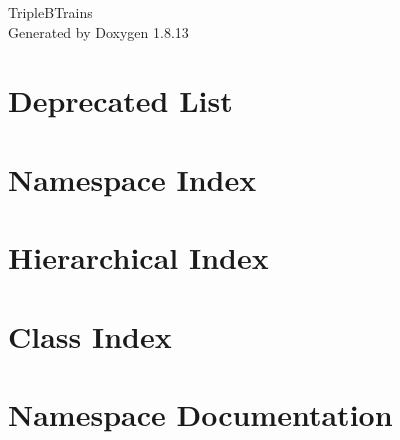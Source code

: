 \documentclass[twoside]{book}
\newcommand{\+}{\discretionary{\mbox{\scriptsize$\hookleftarrow$}}{}{}}
\newcommand{\clearemptydoublepage}{%
  \newpage{\pagestyle{empty}\cleardoublepage}%
}
\begin{document}
\hypersetup{pageanchor=false,
             bookmarksnumbered=true,
             pdfencoding=unicode
            }
\begin{titlepage}
\vspace*{7cm}
\begin{center}%
{\Large Triple\+B\+Trains }\\
\vspace*{1cm}
{\large Generated by Doxygen 1.8.13}\\
\end{center}
\end{titlepage}
\clearemptydoublepage
{}
\tableofcontents
\clearemptydoublepage
{}
\hypersetup{pageanchor=true}

\chapter{Deprecated List}
\label{deprecated}

\chapter{Namespace Index}

\chapter{Hierarchical Index}

\chapter{Class Index}

\chapter{Namespace Documentation}

\end{document}

